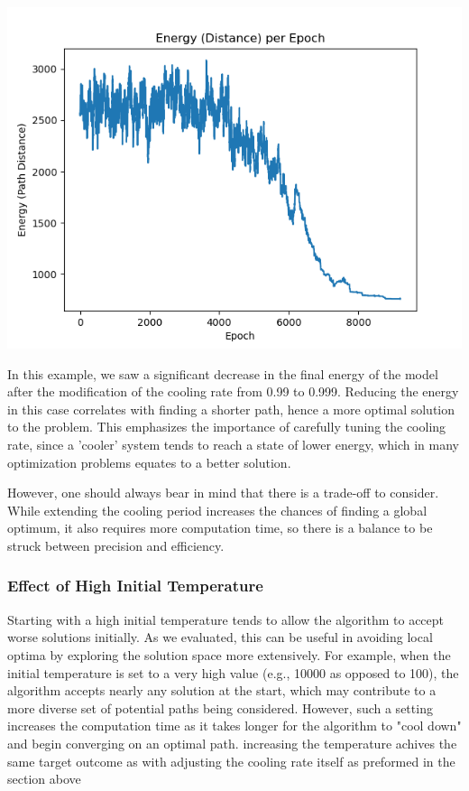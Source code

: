 \documentclass[a4paper,10pt]{article}
\begin{document}
\includegraphics[scale=0.5]{latexGraphs/4_energy.png}

In this example, we saw a significant decrease in the final energy of the model after the modification of the cooling rate from 0.99 to 0.999. Reducing the energy in this case correlates with finding a shorter path, hence a more optimal solution to the problem. This emphasizes the importance of carefully tuning the cooling rate, since a 'cooler' system tends to reach a state of lower energy, which in many optimization problems equates to a better solution. 

However, one should always bear in mind that there is a trade-off to consider. While extending the cooling period increases the chances of finding a global optimum, it also requires more computation time, so there is a balance to be struck between precision and efficiency.



\subsubsection{Effect of High Initial Temperature}
Starting with a high initial temperature tends to allow the algorithm to accept worse solutions initially. As we evaluated, this can be useful in avoiding local optima by exploring the solution space more extensively. For example, when the initial temperature is set to a very high value (e.g., 10000 as opposed to 100), the algorithm accepts nearly any solution at the start, which may contribute to a more diverse set of potential paths being considered. However, such a setting increases the computation time as it takes longer for the algorithm to "cool down" and begin converging on an optimal path. increasing the temperature achives the same target outcome as with adjusting the cooling rate itself as preformed in the section above
\end{document}
